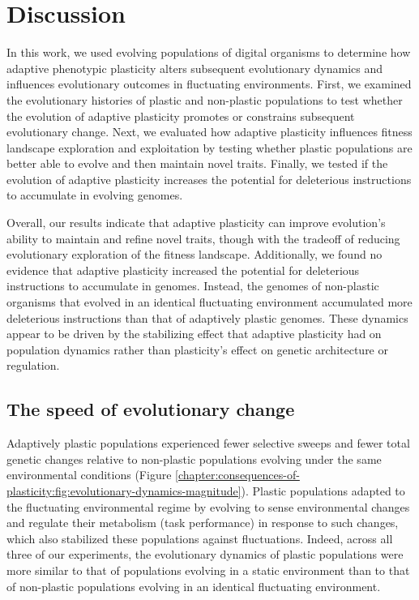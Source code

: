 \section{Discussion}

In this work, we used evolving populations of digital organisms to determine how adaptive phenotypic plasticity alters subsequent evolutionary dynamics and influences evolutionary outcomes in fluctuating environments.
First, we examined the evolutionary histories of plastic and non-plastic populations to test whether the evolution of adaptive plasticity promotes or constrains subsequent evolutionary change.
Next, we evaluated how adaptive plasticity influences fitness landscape exploration and exploitation by testing whether plastic populations are better able to evolve and then maintain novel traits.
Finally, we tested if the evolution of adaptive plasticity increases the potential for deleterious instructions to accumulate in evolving genomes.

Overall, our results indicate that adaptive plasticity can improve evolution's ability to maintain and refine novel traits, though with the tradeoff of reducing evolutionary exploration of the fitness landscape.
Additionally, we found no evidence that adaptive plasticity increased the potential for deleterious instructions to accumulate in genomes.
Instead, the genomes of non-plastic organisms that evolved in an identical fluctuating environment accumulated more deleterious instructions than that of adaptively plastic genomes. 
These dynamics appear to be driven by the stabilizing effect that adaptive plasticity had on population dynamics rather than plasticity's effect on genetic architecture or regulation.

\subsection{The speed of evolutionary change}

Adaptively plastic populations experienced fewer selective sweeps and fewer total genetic changes relative to non-plastic populations evolving under the same environmental conditions (Figure \ref{chapter:consequences-of-plasticity:fig:evolutionary-dynamics-magnitude}).
Plastic populations adapted to the fluctuating environmental regime by evolving to sense environmental changes and regulate their metabolism (task performance) in response to such changes, which also stabilized these populations against fluctuations.
Indeed, across all three of our experiments, the evolutionary dynamics of plastic populations were more similar to that of populations evolving in a static environment than to that of non-plastic populations evolving in an identical fluctuating environment.

